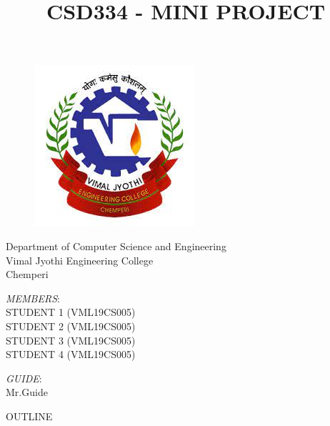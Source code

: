 \documentclass[svgnames,9pt]{beamer}
\title[CSD334]{\huge \textbf{CSD334 - MINI PROJECT}} %
\author[Group1]{}
\date{}
\begin{document}
	\begin{frame}
		
		\begin{figure}[h!]
			\includegraphics[scale=0.25]{img/vjec}
		\end{figure}
		
		\begin{center}      
			\begin{minipage}[b]{1.0\textwidth}
				\centering
				Department of Computer Science and Engineering\\
				Vimal Jyothi Engineering College\\ Chemperi
			\end{minipage}%
		\end{center}
		
		\titlepage
		
		\begin{minipage}[t]{0.5\textwidth}
			\vspace{-2cm}
			\begin{flushleft}
				{ \textit{MEMBERS}:\vspace*{0.1cm} \\STUDENT 1 (VML19CS005)\\STUDENT 2 (VML19CS005)\\STUDENT 3 (VML19CS005)\\STUDENT 4 (VML19CS005) } %
			\end{flushleft}
		\end{minipage}%
		\begin{minipage}[t]{0.5\textwidth}
			\vspace{-2cm}
			\begin{flushright}
				{\textit{GUIDE}:\vspace*{0.1cm} \\ Mr.Guide} %
			\end{flushright}    
		\end{minipage}%
	\end{frame}
\begin{frame}{OUTLINE}
	\tableofcontents
\end{frame}
\end{document}
